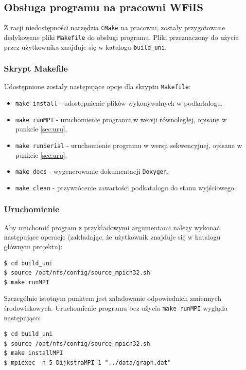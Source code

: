 \documentclass[12pt]{article}
\begin{document}
\subsection{Obsługa programu na pracowni WFiIS}
Z racji niedostępności narzędzia \lstinline|CMake| na pracowni, zostały przygotowane dedykowane pliki \lstinline|Makefile| do obsługi programu. Pliki przeznaczony do użycia przez użytkownika znajduje się w katalogu \lstinline|build_uni|.

\subsubsection{Skrypt Makefile}

Udostępnione zostały następujące opcje dla skryptu \lstinline|Makefile|:
\begin{itemize}
\item \lstinline|make install| - udostępnienie plików wykonywalnych w podkatalogu,
\item \lstinline|make runMPI|  -  uruchomienie programu w wersji równoległej, opisane w punkcie \ref{sec:uru},
\item \lstinline|make runSerial|  - uruchomienie programu w wersji sekwencyjnej, opisane w punkcie  \ref{sec:uru},
\item \lstinline|make docs| - wygenerowanie dokumentacji \lstinline|Doxygen|, 
\item \lstinline|make clean| - przywrócenie zawartości podkatalogu do stanu wyjściowego.
\end{itemize}

\subsubsection{Uruchomienie}
Aby uruchomić program z przykładowymi argumentami należy wykonać następujące operacje (zakładając, że użytkownik znajduje się w katalogu głównym projektu):
\begin{lstlisting}
$ cd build_uni
$ source /opt/nfs/config/source_mpich32.sh
$ make runMPI
\end{lstlisting}

\noindent
Szczególnie istotnym punktem jest załadowanie odpowiednich zmiennych środowiskowych. Uruchomienie programu bez użycia \lstinline|make runMPI| wygląda następująco:
\begin{lstlisting}
$ cd build_uni
$ source /opt/nfs/config/source_mpich32.sh
$ make installMPI
$ mpiexec -n 5 DijkstraMPI 1 "../data/graph.dat"
\end{lstlisting}
\end{document}
